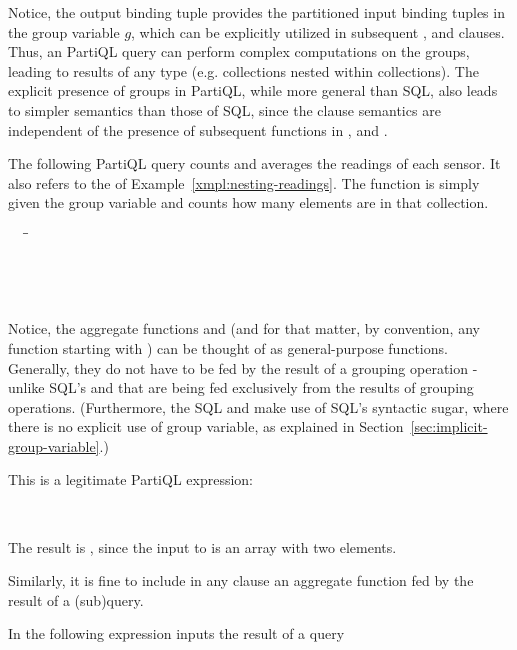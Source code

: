 Notice, the output binding tuple provides the partitioned input binding tuples
in the group variable $g$, which can be explicitly utilized in subsequent
,  and  clauses. Thus, an PartiQL query can
perform complex computations on the groups, leading to results of any type (e.g.
collections nested within collections). The explicit presence of groups in
PartiQL, while more general than SQL, also leads to simpler semantics than those
of SQL, since the  clause semantics are independent of the presence
of subsequent functions in ,  and .

\begin{example}
\label{xmpl:groupby-avg-count}

The following PartiQL query counts and averages the readings of each sensor. It
also refers to the  of Example~\ref{xmpl:nesting-readings}. The
 function is simply given the group variable and counts how many
elements are in that collection.
\begin{tabbing}
\ \ \ \=\=\\
\>\>\\
\>\>\\
\>\\
\>
\end{tabbing}
\end{example}

Notice, the aggregate functions  and  (and for
that matter, by convention, any function starting with ) can be thought
of as general-purpose functions. Generally, they do not have to be fed by the
result of a grouping operation - unlike SQL's  and  that are
being fed exclusively from the results of grouping operations. (Furthermore, the
SQL  and  make use of SQL's syntactic sugar, where there is no
explicit use of group variable, as explained in
Section~\ref{sec:implicit-group-variable}.)

\begin{example} 
This is a legitimate PartiQL expression:
\begin{tabbing} 
\ \ \ \gt{[5, \{a:2, b:3\}]}\gl{)}
\end{tabbing}
The result is , since the input to  is an array with two
elements. 
\end{example}
Similarly, it is fine to include in any clause an aggregate function fed by the
result of a (sub)query.
\begin{example}
In the following expression  inputs the result of a query
\begin{tabbing}
\ \ \ 
\end{tabbing}
\end{example}

